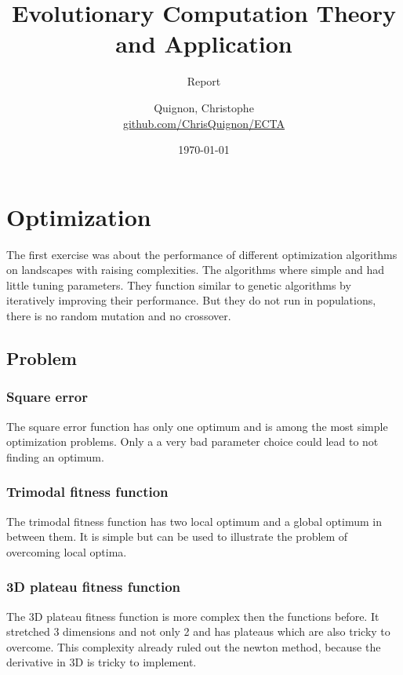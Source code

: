 \documentclass{scrartcl}
\begin{document}
\title{Evolutionary Computation Theory and Application}
\subtitle{Report}
\author{
  Quignon, Christophe \\
  \href{https://github.com/ChrisQuignon/ECTA}{github.com/ChrisQuignon/ECTA}
} 
\date{\today}


\maketitle


\setcounter{tocdepth}{2}
\setcounter{secnumdepth}{2}
\tableofcontents{}


\section{Optimization}
The first exercise was about the performance of different optimization algorithms on landscapes with raising complexities. The algorithms where simple and had little tuning parameters. They function similar to genetic algorithms by iteratively improving their performance. But they do not run in populations, there is no random mutation and no crossover. 

\subsection{Problem}
\subsubsection{Square error}
The square error function has only one optimum and is among the most simple optimization problems. Only a a very bad parameter choice could lead to not finding an optimum.

\subsubsection{Trimodal fitness function}
The trimodal fitness function has two local optimum and a global optimum in between them. It is simple but can be used to illustrate the problem of overcoming local optima.

\subsubsection{3D plateau fitness function}
The 3D plateau fitness function is more complex then the functions before. It stretched 3 dimensions and not only 2 and has plateaus which are also tricky to overcome. This complexity already ruled out the newton method, because the derivative in 3D is tricky to implement.
\end{document}
